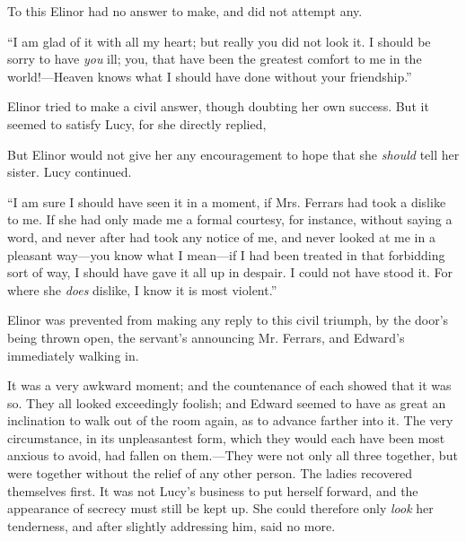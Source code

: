 To this Elinor had no answer to make, and did not attempt any.



“I am glad of it with all my heart; but really you did not look it. I should be sorry to have {\em you} ill; you, that have been the greatest comfort to me in the world!---Heaven knows what I should have done without your friendship.”

Elinor tried to make a civil answer, though doubting her own success. But it seemed to satisfy Lucy, for she directly replied,


But Elinor would not give her any encouragement to hope that she {\em should} tell her sister. Lucy continued.

“I am sure I should have seen it in a moment, if Mrs. Ferrars had took a dislike to me. If she had only made me a formal courtesy, for instance, without saying a word, and never after had took any notice of me, and never looked at me in a pleasant way---you know what I mean---if I had been treated in that forbidding sort of way, I should have gave it all up in despair. I could not have stood it. For where she {\em does} dislike, I know it is most violent.”

Elinor was prevented from making any reply to this civil triumph, by the door's being thrown open, the servant's announcing Mr. Ferrars, and Edward's immediately walking in.

It was a very awkward moment; and the countenance of each showed that it was so. They all looked exceedingly foolish; and Edward seemed to have as great an inclination to walk out of the room again, as to advance farther into it. The very circumstance, in its unpleasantest form, which they would each have been most anxious to avoid, had fallen on them.---They were not only all three together, but were together without the relief of any other person. The ladies recovered themselves first. It was not Lucy's business to put herself forward, and the appearance of secrecy must still be kept up. She could therefore only {\em look} her tenderness, and after slightly addressing him, said no more.

